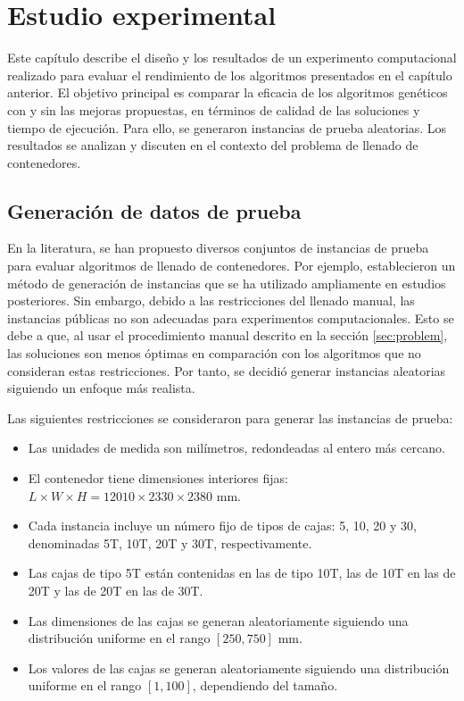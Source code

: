 \section{Estudio experimental}

Este capítulo describe el diseño y los resultados de un experimento computacional realizado para evaluar el rendimiento de los algoritmos presentados en el capítulo anterior. El objetivo principal es comparar la eficacia de los algoritmos genéticos con y sin las mejoras propuestas, en términos de calidad de las soluciones y tiempo de ejecución. Para ello, se generaron instancias de prueba aleatorias. Los resultados se analizan y discuten en el contexto del problema de llenado de contenedores.

\subsection{Generación de datos de prueba}

En la literatura, se han propuesto diversos conjuntos de instancias de prueba para evaluar algoritmos de llenado de contenedores. Por ejemplo, \textcite{BISCHOFF1995377} establecieron un método de generación de instancias que se ha utilizado ampliamente en estudios posteriores. Sin embargo, debido a las restricciones del llenado manual, las instancias públicas no son adecuadas para experimentos computacionales. Esto se debe a que, al usar el procedimiento manual descrito en la sección \ref{sec:problem}, las soluciones son menos óptimas en comparación con los algoritmos que no consideran estas restricciones. Por tanto, se decidió generar instancias aleatorias siguiendo un enfoque más realista.

Las siguientes restricciones se consideraron para generar las instancias de prueba:

\begin{itemize}
    \item Las unidades de medida son milímetros, redondeadas al entero más cercano.
    \item El contenedor tiene dimensiones interiores fijas: $L \times W \times H = 12010 \times 2330 \times 2380$ mm.
    \item Cada instancia incluye un número fijo de tipos de cajas: 5, 10, 20 y 30, denominadas 5T, 10T, 20T y 30T, respectivamente.
    \item Las cajas de tipo 5T están contenidas en las de tipo 10T, las de 10T en las de 20T y las de 20T en las de 30T.
    \item Las dimensiones de las cajas se generan aleatoriamente siguiendo una distribución uniforme en el rango $[250, 750]$ mm.
    \item Los valores de las cajas se generan aleatoriamente siguiendo una distribución uniforme en el rango $[1, 100]$, dependiendo del tamaño.
\end{itemize}

